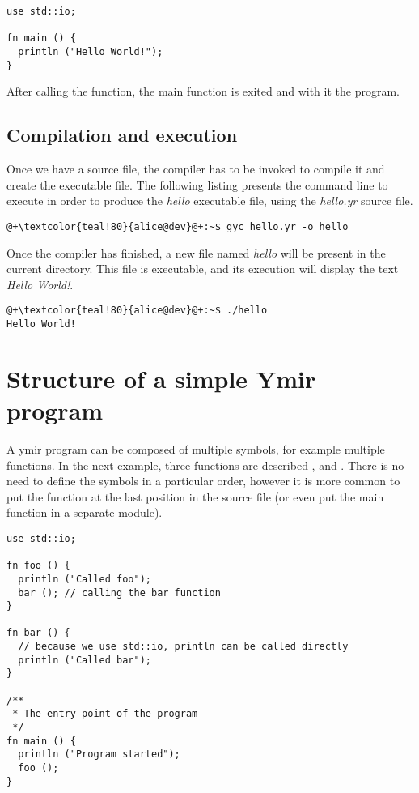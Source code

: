 \begin{lstlisting}[style=coloredverbatim, caption=Source file \textit{hello.yr}]
use std::io;

fn main () {
  println ("Hello World!");
}
\end{lstlisting}

After calling the  function, the main function is exited
and with it the program.

\subsection{Compilation and execution}

Once we have a source file, the compiler has to be invoked to compile it and
create the executable file. The following listing presents the command line to
execute in order to produce the \textit{hello} executable file, using the
\textit{hello.yr} source file.

\begin{lstlisting}[style=bashVerb, escapechar=@+]
@+\textcolor{teal!80}{alice@dev}@+:~$ gyc hello.yr -o hello
\end{lstlisting}

Once the compiler has finished, a new file named \textit{hello} will be present
in the current directory. This file is executable, and its execution will
display the text \textit{Hello World!}.

\begin{lstlisting}[style=bashVerb, escapechar=@+]
@+\textcolor{teal!80}{alice@dev}@+:~$ ./hello
Hello World!
\end{lstlisting}

\section{Structure of a simple Ymir program}

A ymir program can be composed of multiple symbols, for example multiple
functions. In the next example, three functions are described ,
 and . There is no need to define the symbols in a
particular order, however it is more common to put the  function at
the last position in the source file (or even put the main function in a
separate module).

\begin{lstlisting}[style=coloredverbatim, caption=First structured source file]
use std::io;

fn foo () {
  println ("Called foo");
  bar (); // calling the bar function
}

fn bar () {
  // because we use std::io, println can be called directly
  println ("Called bar");
}

/**
 * The entry point of the program
 */
fn main () {
  println ("Program started");
  foo ();
}
\end{lstlisting}

